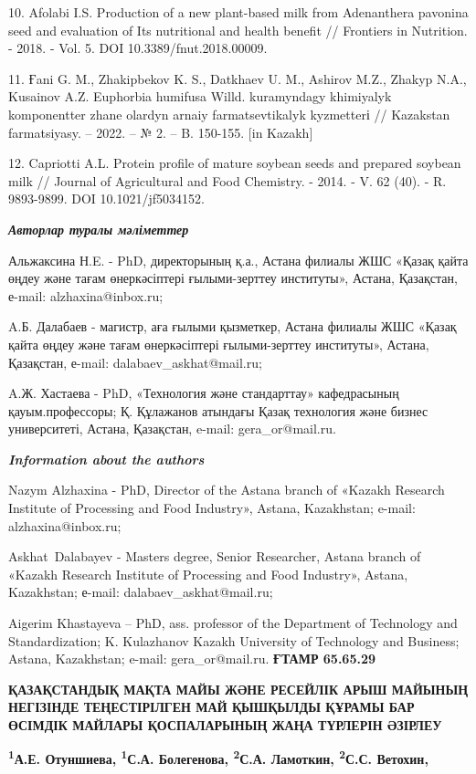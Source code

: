 10. Afolabi I.S. Production of a new plant-based milk from Adenanthera
pavonina seed and evaluation of Its nutritional and health benefit //
Frontiers in Nutrition. - 2018. - Vol. 5. DOI 10.3389/fnut.2018.00009.

11. Ғani G. M., Zhakipbekov K. S., Datkhaev U. M., Ashirov M.Z., Zhakyp
N.A., Kusainov A.Z. Euphorbia humifusa Willd. kuramyndagy khimiyalyk
komponentter zhane olardyn arnaiy farmatsevtikalyk kyzmetterі //
Kazakstan farmatsiyasy. -- 2022. -- № 2. -- B. 150-155. {[}in Kazakh{]}

12. Capriotti A.L. Protein profile of mature soybean seeds and prepared
soybean milk // Journal of Agricultural and Food Chemistry. - 2014. - V.
62 (40). - R. 9893-9899. DOI 10.1021/jf5034152.

\emph{{\bfseries Авторлар туралы мәліметтер}}

Альжаксина Н.E. - PhD, директорының қ.а., Астана филиалы ЖШС «Қазақ
қайта өңдеу және тағам өнеркәсіптері ғылыми-зерттеу институты», Астана,
Қазақстан, е-mail: alzhaxina@inbox.ru;

A.Б. Далабаев - магистр, аға ғылыми қызметкер, Астана филиалы ЖШС «Қазақ
қайта өңдеу және тағам өнеркәсіптері ғылыми-зерттеу институты», Астана,
Қазақстан, е-mail: dalabaev\_askhat@mail.ru;

A.Ж. Хастаева - PhD, «Технология және стандарттау» кафедрасының
қауым.профессоры; Қ. Құлажанов атындағы Қазақ технология және бизнес
университеті, Астана, Қазақстан, e-mail: gera\_or@mail.ru.

\emph{{\bfseries Information about the authors}}

Nazym Alzhaxina - PhD, Director of the Astana branch of «Kazakh Research
Institute of Processing and Food Industry», Astana, Kazakhstan; e-mail:
alzhaxina@inbox.ru;

Askhat~Dalabayev - Masters degree, Senior Researcher, Astana branch of
«Kazakh Research Institute of Processing and Food Industry», Astana,
Kazakhstan; е-mail: dalabaev\_askhat@mail.ru;

Aigerim Khastayeva -- PhD, ass. professor of the Department of
Technology and Standardization; K. Kulazhanov Kazakh University of
Technology and Business; Astana, Kazakhstan; e-mail: gera\_or@mail.ru.\newpage
{\bfseries ҒТАМР 65.65.29}

{\bfseries ҚАЗАҚСТАНДЫҚ МАҚТА МАЙЫ ЖӘНЕ РЕСЕЙЛІК АРЫШ МАЙЫНЫҢ НЕГІЗІНДЕ
ТЕҢЕСТІРІЛГЕН МАЙ ҚЫШҚЫЛДЫ ҚҰРАМЫ БАР ӨСІМДІК МАЙЛАРЫ ҚОСПАЛАРЫНЫҢ ЖАҢА
ТҮРЛЕРІН ӘЗІРЛЕУ}

{\bfseries \textsuperscript{1}А.Е. Отуншиева, \textsuperscript{1}С.А.
Болегенова, \textsuperscript{2}С.А. Ламоткин, \textsuperscript{2}С.С.
Ветохин,}


